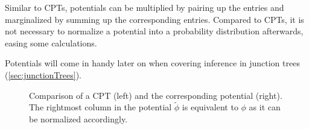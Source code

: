 			Similar to CPTs, potentials can be multiplied by pairing up the entries and marginalized by summing up the corresponding entries. Compared to CPTs, it is not necessary to normalize a potential into a probability distribution afterwards, easing some calculations.

			Potentials will come in handy later on when covering inference in junction trees (\autoref{sec:junctionTrees}).

			\begin{figure}
				\caption[Comparison of CPT and Potential]{Comparison of a CPT (left) and the corresponding potential (right). The rightmost column in the potential \( \tilde{\phi} \) is equivalent to \( \phi \) as it can be normalized accordingly.}
				\label{fig:potetial}
			\end{figure}
